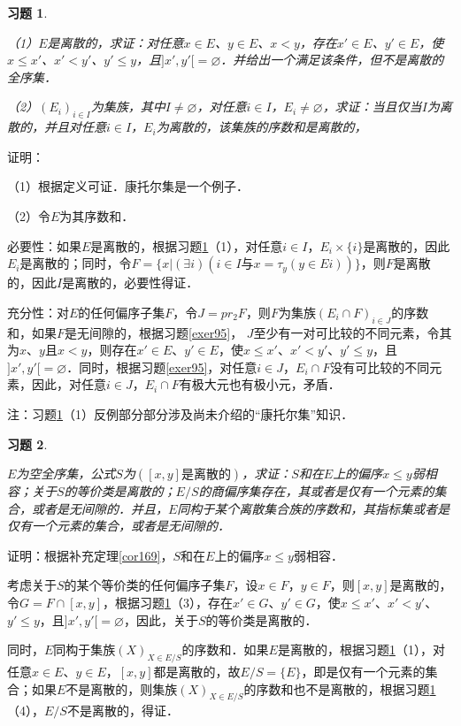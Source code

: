 \documentclass[12pt, a4paper, oneside]{book}
\newtheorem{exer}{习题}
\begin{document}
			\begin{exer}\label{exer96}
				\hfill\par
				（1）$E$是离散的，求证：对任意$x\in E$、$y\in E$、$x<y$，存在$x'\in E$、$y'\in E$，使$x\leq x'$、$x'<y'$、$y'\leq y$，且$]x', y'[=\varnothing$．并给出一个满足该条件，但不是离散的全序集．
				\par
				（2）$(E_i)_{i\in I}$为集族，其中$I\neq \varnothing$，对任意$i\in I$，$E_i\neq \varnothing$，求证：当且仅当$I$为离散的，并且对任意$i\in I$，$E_i$为离散的，该集族的序数和是离散的，
			\end{exer}
			证明：
			\par
			（1）根据定义可证．康托尔集是一个例子．
			\par
			（2）令$E$为其序数和．
			\par
			必要性：如果$E$是离散的，根据习题\ref{exer96}（1），对任意$i\in I$，$E_i\times \{i\}$是离散的，因此$E_i$是离散的；同时，令$F=\{x|(\exists i)(i\in I\text{与}x=\tau_y(y\in Ei))\}$，则$F$是离散的，因此$I$是离散的，必要性得证．
			\par
			充分性：对$E$的任何偏序子集$F$，令$J=pr_2F$，则$F$为集族$(E_i\cap F)_{i\in J}$的序数和，如果$F$是无间隙的，根据习题\ref{exer95}， $J$至少有一对可比较的不同元素，令其为$x$、$y$且$x<y$，则存在$x'\in E$、$y'\in E$，使$x\leq x'$、$x'<y'$、$y'\leq y$，且$]x', y'[=\varnothing$．同时，根据习题\ref{exer95}，对任意$i\in J$，$E_i\cap F$没有可比较的不同元素，因此，对任意$i\in J$，$E_i\cap F$有极大元也有极小元，矛盾．
			\par
			注：习题\ref{exer96}（1）反例部分部分涉及尚未介绍的“康托尔集”知识．

			\begin{exer}\label{exer97}
				\hfill\par
				$E$为空全序集，公式$S$为$([x, y]\text{是离散的})$，求证：$S$和在$E$上的偏序$x\leq y$弱相容；关于$S$的等价类是离散的；$E/S$的商偏序集存在，其或者是仅有一个元素的集合，或者是无间隙的．并且，$E$同构于某个离散集合族的序数和，其指标集或者是仅有一个元素的集合，或者是无间隙的．
			\end{exer}
			证明：根据补充定理\ref{cor169}，$S$和在$E$上的偏序$x\leq y$弱相容．
			\par
			考虑关于$S$的某个等价类的任何偏序子集$F$，设$x\in F$，$y\in F$，则$[x, y]$是离散的，令$G=F\cap [x, y]$，根据习题\ref{exer96}（3），存在$x'\in G$、$y'\in G$，使$x\leq x'$、$x'<y'$、$y'\leq y$，且$]x', y'[=\varnothing$，因此，关于$S$的等价类是离散的．
			\par
			同时，$E$同构于集族$(X)_{X\in E/S}$的序数和．如果$E$是离散的，根据习题\ref{exer96}（1），对任意$x\in E$、$y\in E$，$[x, y]$都是离散的，故$E/S=\{E\}$，即是仅有一个元素的集合；如果$E$不是离散的，则集族$(X)_{X\in E/S}$的序数和也不是离散的，根据习题\ref{exer96}（4），$E/S$不是离散的，得证．
			
\end{document}
